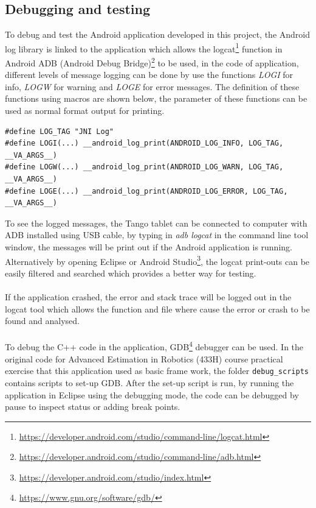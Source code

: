 \documentclass[12pt,twoside]{article}
\begin{document}
\subsection{Debugging and testing}
To debug and test the Android application developed in this project, the Android log library is linked to the application which allows the logcat\footnote{\url{https://developer.android.com/studio/command-line/logcat.html}} function in Android ADB (Android Debug Bridge)\footnote{\url{https://developer.android.com/studio/command-line/adb.html}} to be used, in the code of application, different levels of message logging can be done by use the functions \textit{LOGI} for info, \textit{LOGW} for warning and \textit{LOGE} for error messages. The definition of these functions using macros are shown below, the parameter of these functions can be used as normal format output for printing.
\begin{lstlisting}
#define LOG_TAG "JNI Log"
#define LOGI(...) __android_log_print(ANDROID_LOG_INFO, LOG_TAG, __VA_ARGS__)
#define LOGW(...) __android_log_print(ANDROID_LOG_WARN, LOG_TAG, __VA_ARGS__)
#define LOGE(...) __android_log_print(ANDROID_LOG_ERROR, LOG_TAG, __VA_ARGS__)
\end{lstlisting}
To see the logged messages, the Tango tablet can be connected to computer with ADB installed using USB cable, by typing in \textit{adb logcat} in the command line tool window, the messages will be print out if the Android application is running. Alternatively by opening Eclipse or Android Studio\footnote{\url{https://developer.android.com/studio/index.html}}, the logcat print-outs can be easily filtered and searched which provides a better way for testing.\\
\\
If the application crashed, the error and stack trace will be logged out in the logcat tool which allows the function and file where cause the error or crash to be found and analysed.\\
\\
To debug the C++ code in the application, GDB\footnote{\url{https://www.gnu.org/software/gdb/}} debugger can be used. In the original code for Advanced Estimation in Robotics (433H) course practical exercise that this application used as basic frame work, the folder \verb|debug_scripts| contains scripts to set-up GDB. After the set-up script is run, by running the application in Eclipse using the debugging mode, the code can be debugged by pause to inspect status or adding break points.\\
\end{document}
